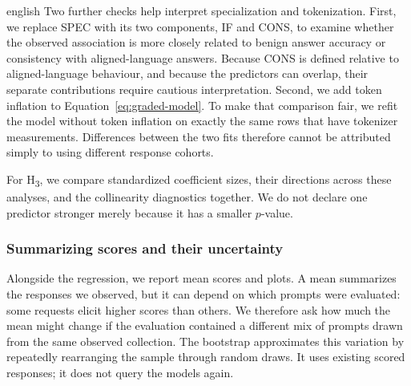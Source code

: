 \begin{otherlanguage*}{english}
Two further checks help interpret specialization and tokenization. First, we replace SPEC with its two components, IF and CONS, to examine whether the observed association is more closely related to benign answer accuracy or consistency with aligned-language answers. Because CONS is defined relative to aligned-language behaviour, and because the predictors can overlap, their separate contributions require cautious interpretation. Second, we add token inflation to Equation~\ref{eq:graded-model}. To make that comparison fair, we refit the model without token inflation on exactly the same rows that have tokenizer measurements. Differences between the two fits therefore cannot be attributed simply to using different response cohorts.


For H\textsubscript{3}, we compare standardized coefficient sizes, their directions across these analyses, and the collinearity diagnostics together. We do not declare one predictor stronger merely because it has a smaller $p$-value.


\subsubsection{Summarizing scores and their uncertainty}

Alongside the regression, we report mean scores and plots. A mean summarizes the responses we observed, but it can depend on which prompts were evaluated: some requests elicit higher scores than others. We therefore ask how much the mean might change if the evaluation contained a different mix of prompts drawn from the same observed collection. The bootstrap approximates this variation by repeatedly rearranging the sample through random draws. It uses existing scored responses; it does not query the models again.


\end{otherlanguage*}
